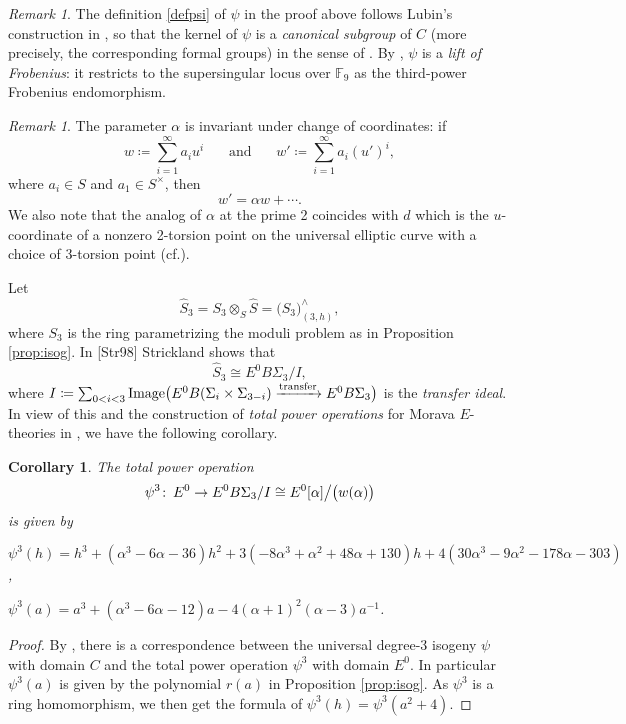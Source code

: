 \documentclass{gtpart}
\newtheorem{cor}[thm]{Corollary}
\theoremstyle{definition}
\theoremstyle{remark}
\newtheorem{rmk}[thm]{Remark}
\def\co{\colon\thinspace}
\newcommand{\mb}[1]{\mathbb{#1}}
\newcommand{\cff}[2]{cf.\thinspace{\cite[#1]{#2}}}
\newcommand{\BF}{{\mb F}}
\newcommand{\HS}{\widehat{S}}
\newcommand{\A}{\alpha}
\newcommand{\p}{\psi^3}
\begin{document}
\begin{rmk}
\label{rmk:lubin}
 The definition \eqref{defpsi} of $\psi$ in the proof above follows Lubin's construction in \cite[proof of Theorem 1.4]{lubin67}, 
 so that the kernel of $\psi$ is a {\em canonical subgroup} of $C$ (more precisely, the corresponding formal groups) in the sense of \cite{lubin79}.  
 By \cite[Theorem B]{lubin79}, $\psi$ is a {\em lift of Frobenius}: it restricts to the supersingular locus over $\BF_9$ as the third-power Frobenius endomorphism.  
\end{rmk}

\begin{rmk}
\label{rmk:alpha}
 The parameter $\A$ is invariant under change of coordinates: if 
 \[
  w \coloneqq \sum_{i = 1}^\infty a_i u^i~~~~~~~~\text{and}~~~~~~~~w' \coloneqq \sum_{i = 1}^\infty a_i (u')^i, 
 \]
 where $a_i \in S$ and $a_1 \in S^\times$, then 
 \[
  w' = \A w + \cdots.  
 \]
 We also note that the analog of $\A$ at the prime 2 coincides with $d$ 
 which is the $u$-coordinate of a nonzero 2-torsion point on the universal elliptic curve with a choice of 3-torsion point (\cff{Section 3}{h2p2}).  
\end{rmk}

Let 
\begin{equation}
\label{S3hat}
 \HS_3 = S_3 \otimes_S \HS = \big( S_3 \big)_{(3,h)}^\wedge, 
\end{equation}
where $S_3$ is the ring parametrizing the moduli problem as in Proposition \ref{prop:isog}.  In [Str98] Strickland shows that 
\[
 \HS_3 \cong E^0 B\Sigma_3 / I, 
\]
where $I \coloneqq \sum_{0<i<3} {\rm Image} \big( E^0 B(\Sigma_i \times \Sigma_{3-i}) \xrightarrow{\rm transfer} E^0 B\Sigma_3 \big)$ is the {\em transfer ideal}.  
In view of this and the construction of {\em total power operations} for Morava $E$-theories in \cite[3.23]{cong}, we have the following corollary.  

\begin{cor}
\label{cor:psi3}
 The total power operation 
 \[
  \p \co E^0 \to E^0 B\Sigma_3 / I \cong E^0 [\A] \big/ \big( w(\A) \big) 
 \]
 is given by 
 
 $\p(h) = h^3 + (\A^3 - 6 \A - 36) h^2 + 3 (-8 \A^3 + \A^2 + 48 \A + 130) h + 4 (30 \A^3 - 9 \A^2 - 178 \A - 303)$, 
 
 $\p(a) = a^3 + (\A^3 - 6 \A - 12) a - 4 (\A + 1)^2 (\A - 3) a^{-1}$.  
 
\end{cor}
\begin{proof}
 By \cite[Theorem B]{cong}, there is a correspondence between the universal degree-3 isogeny $\psi$ with domain $C$ 
 and the total power operation $\p$ with domain $E^0$.  In particular $\p(a)$ is given by the polynomial $r(a)$ in Proposition \ref{prop:isog}.  
 As $\p$ is a ring homomorphism, we then get the formula of $\p(h) = \p(a^2 + 4)$.  
\end{proof}
\end{document}
